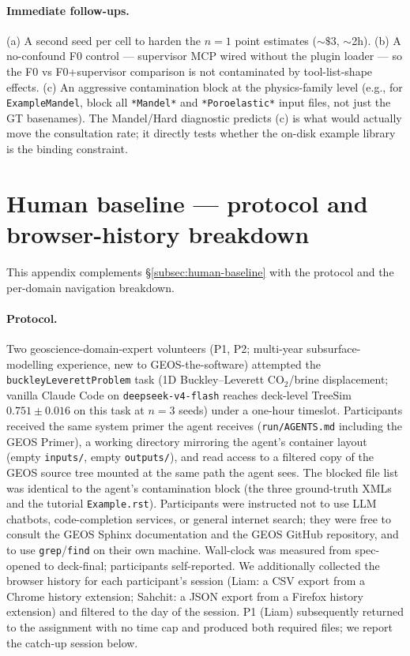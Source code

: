 \documentclass{article}
\begin{document}
\paragraph{Immediate follow-ups.} (a) A second seed per cell to harden the $n=1$ point estimates ($\sim\$3$, $\sim$2h). (b) A no-confound F0 control --- supervisor MCP wired without the plugin loader --- so the F0 vs F0+supervisor comparison is not contaminated by tool-list-shape effects. (c) An aggressive contamination block at the physics-family level (e.g., for \texttt{ExampleMandel}, block all \texttt{*Mandel*} and \texttt{*Poroelastic*} input files, not just the GT basenames). The Mandel/Hard diagnostic predicts (c) is what would actually move the consultation rate; it directly tests whether the on-disk example library is the binding constraint.

\section{Human baseline --- protocol and browser-history breakdown}
\label{app:human-browser}

This appendix complements \S\ref{subsec:human-baseline} with the protocol and the per-domain navigation breakdown.

\paragraph{Protocol.} Two geoscience-domain-expert volunteers (P1, P2; multi-year subsurface-modelling experience, new to GEOS-the-software) attempted the \texttt{buckleyLeverettProblem} task (1D Buckley--Leverett CO$_2$/brine displacement; vanilla Claude Code on \texttt{deepseek-v4-flash} reaches deck-level TreeSim $0.751 \pm 0.016$ on this task at $n=3$ seeds) under a one-hour timeslot. Participants received the same system primer the agent receives (\texttt{run/AGENTS.md} including the GEOS Primer), a working directory mirroring the agent's container layout (empty \texttt{inputs/}, empty \texttt{outputs/}), and read access to a filtered copy of the GEOS source tree mounted at the same path the agent sees. The blocked file list was identical to the agent's contamination block (the three ground-truth XMLs and the tutorial \texttt{Example.rst}). Participants were instructed not to use LLM chatbots, code-completion services, or general internet search; they were free to consult the GEOS Sphinx documentation and the GEOS GitHub repository, and to use \texttt{grep}/\texttt{find} on their own machine. Wall-clock was measured from spec-opened to deck-final; participants self-reported. We additionally collected the browser history for each participant's session (Liam: a CSV export from a Chrome history extension; Sahchit: a JSON export from a Firefox history extension) and filtered to the day of the session. P1 (Liam) subsequently returned to the assignment with no time cap and produced both required files; we report the catch-up session below.
\end{document}
